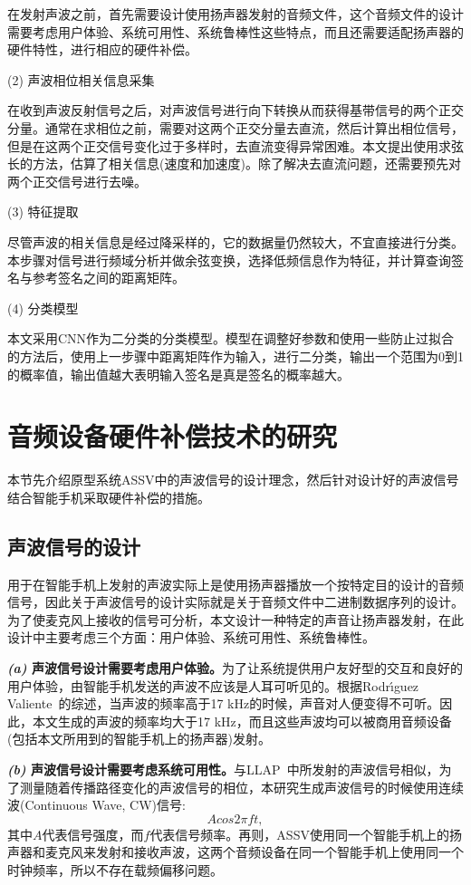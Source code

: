 在发射声波之前，首先需要设计使用扬声器发射的音频文件，这个音频文件的设计需要考虑用户体验、系统可用性、系统鲁棒性这些特点，而且还需要适配扬声器的硬件特性，进行相应的硬件补偿。


(2) 声波相位相关信息采集

在收到声波反射信号之后，对声波信号进行向下转换从而获得基带信号的两个正交分量。通常在求相位之前，需要对这两个正交分量去直流，然后计算出相位信号，但是在这两个正交信号变化过于多样时，去直流变得异常困难。本文提出使用求弦长的方法，估算了相关信息(速度和加速度)。除了解决去直流问题，还需要预先对两个正交信号进行去噪。


(3) 特征提取

尽管声波的相关信息是经过降采样的，它的数据量仍然较大，不宜直接进行分类。本步骤对信号进行频域分析并做余弦变换，选择低频信息作为特征，并计算查询签名与参考签名之间的距离矩阵。

(4) 分类模型

本文采用CNN作为二分类的分类模型。模型在调整好参数和使用一些防止过拟合的方法后，使用上一步骤中距离矩阵作为输入，进行二分类，输出一个范围为0到1的概率值，输出值越大表明输入签名是真是签名的概率越大。

\section{音频设备硬件补偿技术的研究}\label{sec:audio-research}

本节先介绍原型系统ASSV中的声波信号的设计理念，然后针对设计好的声波信号结合智能手机采取硬件补偿的措施。

\subsection{声波信号的设计}

用于在智能手机上发射的声波实际上是使用扬声器播放一个按特定目的设计的音频信号，因此关于声波信号的设计实际就是关于音频文件中二进制数据序列的设计。为了使麦克风上接收的信号可分析，本文设计一种特定的声音让扬声器发射，在此设计中主要考虑三个方面：用户体验、系统可用性、系统鲁棒性。

\textbf{\textit{(a)} 声波信号设计需要考虑用户体验。}为了让系统提供用户友好型的交互和良好的用户体验，由智能手机发送的声波不应该是人耳可听见的。根据Rodr{\'\i}guez Valiente~\cite{rodriguez2014extended}的综述，当声波的频率高于17 kHz的时候，声音对人便变得不可听。因此，本文生成的声波的频率均大于17 kHz，而且这些声波均可以被商用音频设备(包括本文所用到的智能手机上的扬声器)发射。

\textbf{\textit{(b)} 声波信号设计需要考虑系统可用性。}与LLAP~\cite{wang2016device}中所发射的声波信号相似，为了测量随着传播路径变化的声波信号的相位，本研究生成声波信号的时候使用连续波(Continuous Wave, CW)信号:
$$
Acos2\pi ft, 
$$
其中$A$代表信号强度，而$f$代表信号频率。再则，ASSV使用同一个智能手机上的扬声器和麦克风来发射和接收声波，这两个音频设备在同一个智能手机上使用同一个时钟频率，所以不存在载频偏移问题。


